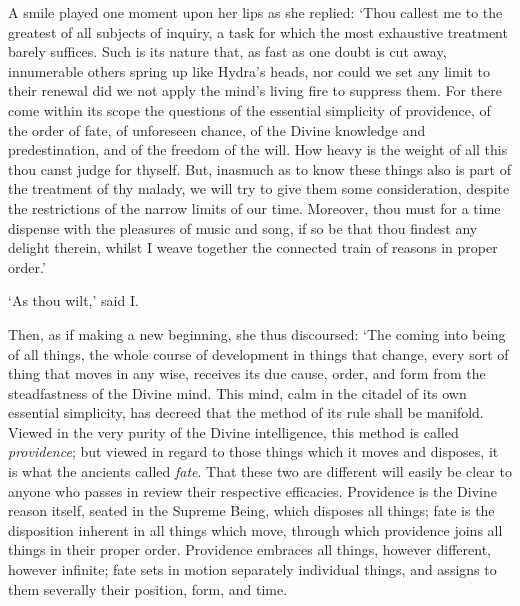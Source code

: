 \documentclass[12pt]{book}
\begin{document}
A smile played one moment upon her lips as she replied: `Thou callest me
to the greatest of all subjects of inquiry, a task for which the most
exhaustive treatment barely suffices. Such is its nature that, as fast
as one doubt is cut away, innumerable others spring up like Hydra's
heads, nor could we set any limit to their renewal did we not apply the
mind's living fire to suppress them. For there come within its scope the
questions of the essential simplicity of providence, of the order of
fate, of unforeseen chance, of the Divine knowledge and predestination,
and of the freedom of the will. How heavy is the weight of all this
thou canst judge for thyself. But, inasmuch as to know these things also
is part of the treatment of thy malady, we will try to give them some
consideration, despite the restrictions of the narrow limits of our
time. Moreover, thou must for a time dispense with the pleasures of
music and song, if so be that thou findest any delight therein, whilst I
weave together the connected train of reasons in proper order.'

`As thou wilt,' said I.

Then, as if making a new beginning, she thus discoursed: `The coming
into being of all things, the whole course of development in things that
change, every sort of thing that moves in any wise, receives its due
cause, order, and form from the steadfastness of the Divine mind. This
mind, calm in the citadel of its own essential simplicity, has decreed
that the method of its rule shall be manifold. Viewed in the very purity
of the Divine intelligence, this method is called \emph{providence}; but
viewed in regard to those things which it moves and disposes, it is
what the ancients called \emph{fate}. That these two are different will
easily be clear to anyone who passes in review their respective
efficacies. Providence is the Divine reason itself, seated in the
Supreme Being, which disposes all things; fate is the disposition
inherent in all things which move, through which providence joins all
things in their proper order. Providence embraces all things, however
different, however infinite; fate sets in motion separately individual
things, and assigns to them severally their position, form, and time.
\end{document}
